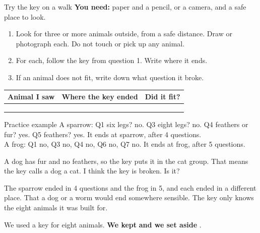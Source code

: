 \begin{tryit}{Try the key on a walk}
\textbf{You need:} paper and a pencil, or a camera, and a safe place to look.
\begin{enumerate}[leftmargin=1.6em]
\item Look for three or more animals outside, from a safe distance. Draw or photograph each. Do not touch or pick up any animal.
\item For each, follow the key from question 1. Write where it ends.
\item If an animal does not fit, write down what question it broke.
\end{enumerate}
\par\medskip
\renewcommand{\arraystretch}{1.8}
\begin{tabular}{|l|c|c|}
\hline
\textbf{Animal I saw} & \textbf{Where the key ended} & \textbf{Did it fit?}\\ \hline
 & & \\ \hline
 & & \\ \hline
 & & \\ \hline
\end{tabular}
\end{tryit}

\begin{worked}{Practice example}
A sparrow: Q1 six legs? no. Q3 eight legs? no. Q4 feathers or fur? yes. Q5 feathers? yes. It ends at sparrow, after 4 questions.\\
A frog: Q1 no, Q3 no, Q4 no, Q6 no, Q7 no. It ends at frog, after 5 questions.
\end{worked}

\begin{multix}[hmm]\multixbot[hmm]\tcblower
A dog has fur and no feathers, so the key puts it in the cat group. That means the key calls a dog a cat. I think the key is broken. Is it?
\end{multix}

{The sparrow ended in 4 questions and the frog in 5, and each ended in a different place.}
{That a dog or a worm would end somewhere sensible. The key only knows the eight animals it was built for.}

\begin{keepbox}
We used a key for eight animals. \textbf{We kept} \wline[3.4cm] \textbf{and we set aside} \wline[3.4cm].
\end{keepbox}


